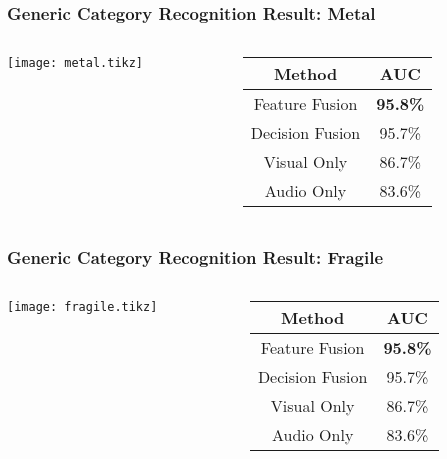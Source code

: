 \documentclass{beamer}
\begin{document}
  \begin{frame}
    \frametitle{Generic Category Recognition Result: Metal}
    
    \begin{columns}
      \begin{column}{.6\textwidth}
        \centering
        \footnotesize
        \texttt{[image: metal.tikz]}
      \end{column}
      \begin{column}{.4\textwidth}
        \footnotesize
        \begin{tabular}[h]{c|c}
          \hline
          Method & AUC \\ \hline \hline
          Feature Fusion & \textbf{95.8\%} \\ \hline
          Decision Fusion  & 95.7\% \\ \hline
          Visual Only & 86.7\% \\ \hline
          Audio Only & 83.6\% \\ \hline
        \end{tabular}
      \end{column}
    \end{columns}
  \end{frame}

  \begin{frame}
    \frametitle{Generic Category Recognition Result: Fragile}
    
    \begin{columns}
      \begin{column}{.6\textwidth}
        \centering
        \footnotesize
        \texttt{[image: fragile.tikz]}
      \end{column}
      \begin{column}{.4\textwidth}
        \footnotesize
        \begin{tabular}[h]{c|c}
          \hline
          Method & AUC \\ \hline \hline
          Feature Fusion & \textbf{95.8\%} \\ \hline
          Decision Fusion  & 95.7\% \\ \hline
          Visual Only & 86.7\% \\ \hline
          Audio Only & 83.6\% \\ \hline
        \end{tabular}
      \end{column}
    \end{columns}
  \end{frame}
\end{document}
